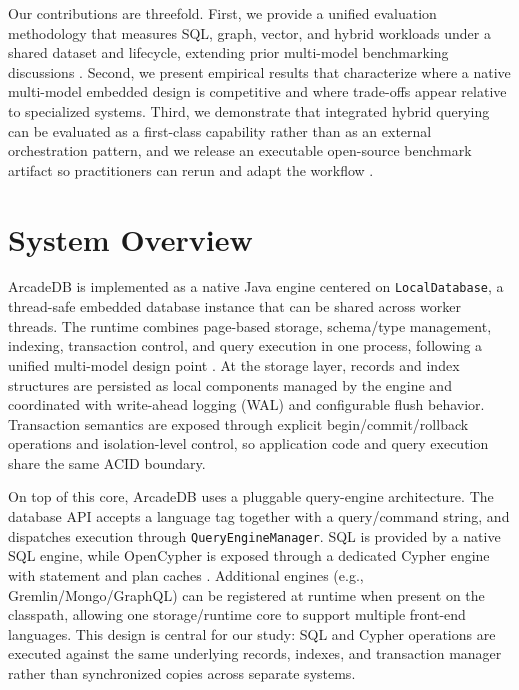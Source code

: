 \documentclass[sigconf, nonacm]{acmart}
\begin{document}
Our contributions are threefold. First, we provide a unified evaluation methodology that measures SQL, graph, vector, and hybrid workloads under a shared dataset and lifecycle, extending prior multi-model benchmarking discussions \cite{Zhang_2019_Unibench,Kim_2022,Zhang_2019_Holistic}. Second, we present empirical results that characterize where a native multi-model embedded design is competitive and where trade-offs appear relative to specialized systems. Third, we demonstrate that integrated hybrid querying can be evaluated as a first-class capability rather than as an external orchestration pattern, and we release an executable open-source benchmark artifact so practitioners can rerun and adapt the workflow \cite{arcadedb_repo}.

\section{System Overview}

ArcadeDB is implemented as a native Java engine centered on \texttt{LocalDatabase}, a thread-safe embedded database instance that can be shared across worker threads. The runtime combines page-based storage, schema/type management, indexing, transaction control, and query execution in one process, following a unified multi-model design point \cite{Lu_2019,Guo_2023}. At the storage layer, records and index structures are persisted as local components managed by the engine and coordinated with write-ahead logging (WAL) and configurable flush behavior. Transaction semantics are exposed through explicit begin/commit/rollback operations and isolation-level control, so application code and query execution share the same ACID boundary.

On top of this core, ArcadeDB uses a pluggable query-engine architecture. The database API accepts a language tag together with a query/command string, and dispatches execution through \texttt{QueryEngineManager}. SQL is provided by a native SQL engine, while OpenCypher is exposed through a dedicated Cypher engine with statement and plan caches \cite{opencypher_spec,marton2017formalising}. Additional engines (e.g., Gremlin/Mongo/GraphQL) can be registered at runtime when present on the classpath, allowing one storage/runtime core to support multiple front-end languages. This design is central for our study: SQL and Cypher operations are executed against the same underlying records, indexes, and transaction manager rather than synchronized copies across separate systems.
\end{document}
